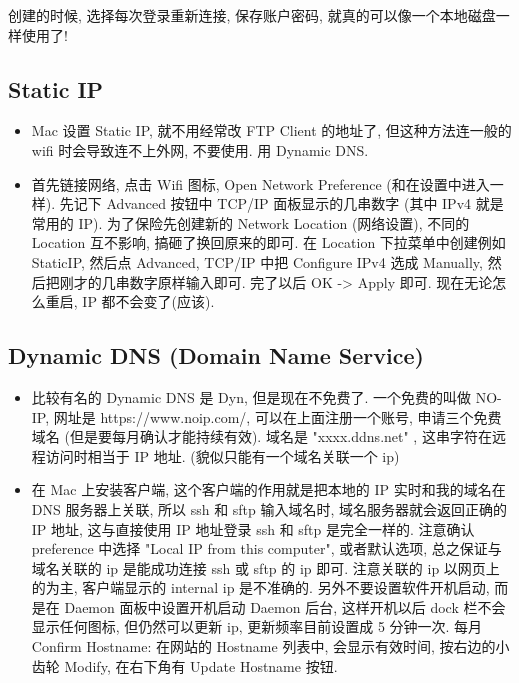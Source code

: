 创建的时候, 选择每次登录重新连接, 保存账户密码, 就真的可以像一个本地磁盘一样使用了!

\subsection{Static IP}
\begin{itemize}
\item Mac 设置 Static IP, 就不用经常改 FTP Client 的地址了, 但这种方法连一般的 wifi 时会导致连不上外网, 不要使用. 用 Dynamic DNS.
\item 首先链接网络, 点击 Wifi 图标, Open Network Preference (和在设置中进入一样). 先记下 Advanced 按钮中 TCP/IP 面板显示的几串数字 (其中 IPv4 就是常用的 IP). 为了保险先创建新的 Network Location (网络设置), 不同的 Location 互不影响, 搞砸了换回原来的即可. 在 Location 下拉菜单中创建例如 StaticIP, 然后点 Advanced, TCP/IP 中把 Configure IPv4 选成 Manually, 然后把刚才的几串数字原样输入即可. 完了以后 OK -> Apply 即可. 现在无论怎么重启, IP 都不会变了(应该).
\end{itemize}

\subsection{Dynamic DNS (Domain Name Service)}
\begin{itemize}
\item 比较有名的 Dynamic DNS 是 Dyn, 但是现在不免费了. 一个免费的叫做 NO-IP, 网址是 https://www.noip.com/, 可以在上面注册一个账号, 申请三个免费域名 (但是要每月确认才能持续有效).  域名是 "xxxx.ddns.net"  , 这串字符在远程访问时相当于 IP 地址. (貌似只能有一个域名关联一个 ip)

\item 在 Mac 上安装客户端, 这个客户端的作用就是把本地的 IP 实时和我的域名在 DNS 服务器上关联, 所以 ssh 和 sftp 输入域名时, 域名服务器就会返回正确的 IP 地址, 这与直接使用 IP 地址登录 ssh 和 sftp 是完全一样的.
注意确认 preference 中选择 "Local IP from this computer", 或者默认选项, 总之保证与域名关联的 ip 是能成功连接 ssh 或 sftp 的 ip 即可. 注意关联的 ip 以网页上的为主, 客户端显示的 internal ip 是不准确的.
另外不要设置软件开机启动, 而是在 Daemon 面板中设置开机启动 Daemon 后台, 这样开机以后 dock 栏不会显示任何图标, 但仍然可以更新 ip, 更新频率目前设置成 5 分钟一次.
每月 Confirm Hostname: 在网站的 Hostname 列表中, 会显示有效时间, 按右边的小齿轮 Modify, 在右下角有 Update Hostname 按钮.
\end{itemize}
